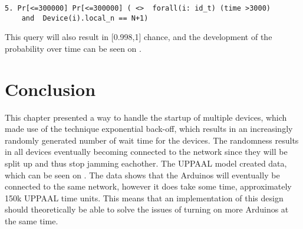 \begin{lstlisting}[style=UPPAAL, title={This query asks after 3000 UPPAAL time units has passed, what then is the probability that a device \texttt{i} has a local value of \texttt{n} to be equal to the number of devices, which is \texttt{N} + 1, which means that all devices are in the same network.}]
5. Pr[<=300000] Pr[<=300000] ( <>  forall(i: id_t) (time >3000) 
	and  Device(i).local_n == N+1)
\end{lstlisting}

\noindent This query will also result in [0.998,1] chance, and the development of the probability over time can be seen on .


\section{Conclusion}

This chapter presented a way to handle the startup of multiple devices, which made use of the technique exponential back-off, which results in an increasingly randomly generated number of wait time for the devices. 
The randomness results in all devices eventually becoming connected to the network since they will be split up and thus stop jamming eachother.
The UPPAAL model created data, which can be seen on .
The data shows that the Arduinos will eventually be connected to the same network, however it does take some time, approximately 150k UPPAAL time units.
This means that an implementation of this design should theoretically be able to solve the issues of turning on more Arduinos at the same time.


